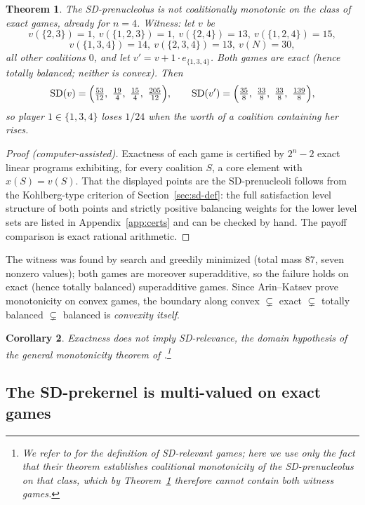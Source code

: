 \documentclass[11pt]{article}
\newtheorem{theorem}{Theorem}[section]
\newtheorem{corollary}[theorem]{Corollary}
\newcommand{\SD}{\operatorname{SD}}
\begin{document}
\begin{theorem}\label{thm:sdexact}
The SD-prenucleolus is not coalitionally monotonic on the class of exact
games, already for $n=4$. Witness: let $v$ be
\[
v(\{2,3\})=1,\ v(\{1,2,3\})=1,\ v(\{2,4\})=13,\ v(\{1,2,4\})=15,
\]
\[
v(\{1,3,4\})=14,\ v(\{2,3,4\})=13,\ v(N)=30,
\]
all other coalitions $0$, and let $v'=v+1\cdot e_{\{1,3,4\}}$. Both games are
exact (hence totally balanced; neither is convex). Then
\[
\SD(v)=\Bigl(\tfrac{53}{12},\ \tfrac{19}{4},\ \tfrac{15}{4},\ \tfrac{205}{12}\Bigr),
\qquad
\SD(v')=\Bigl(\tfrac{35}{8},\ \tfrac{33}{8},\ \tfrac{33}{8},\ \tfrac{139}{8}\Bigr),
\]
so player $1\in\{1,3,4\}$ loses $1/24$ when the worth of a coalition
containing her rises.
\end{theorem}

\begin{proof}[Proof (computer-assisted)]
Exactness of each game is certified by $2^n-2$ exact linear programs
exhibiting, for every coalition $S$, a core element with $x(S)=v(S)$. That
the displayed points are the SD-prenucleoli follows from the Kohlberg-type
criterion of Section~\ref{sec:sd-def}: the full satisfaction level structure
of both points and strictly positive balancing weights for the lower level
sets are listed in Appendix~\ref{app:certs} and can be checked by hand. The
payoff comparison is exact rational arithmetic.
\end{proof}

The witness was found by search and greedily minimized (total mass $87$,
seven nonzero values); both games are moreover superadditive, so the failure
holds on exact (hence totally balanced) superadditive games. Since
Arin--Katsev prove monotonicity
on convex games, the boundary along
convex $\subsetneq$ exact $\subsetneq$ totally balanced $\subsetneq$ balanced
is \emph{convexity itself}.

\begin{corollary}
Exactness does not imply SD-relevance, the domain hypothesis of the general
monotonicity theorem of \citet{ArinKatsev2018}.\footnote{We refer to
\citet{ArinKatsev2018} for the definition of SD-relevant games; here we use
only the fact that their theorem establishes coalitional monotonicity of the
SD-prenucleolus on that class, which by Theorem~\ref{thm:sdexact} therefore
cannot contain both witness games.}
\end{corollary}

\subsection{The SD-prekernel is multi-valued on exact games}
\end{document}
